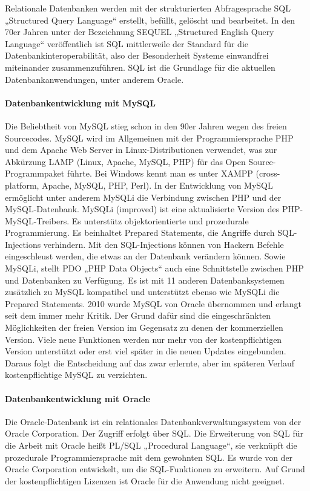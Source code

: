 Relationale Datenbanken werden mit der strukturierten Abfragesprache SQL „Structured Query Language“ erstellt, befüllt, gelöscht und bearbeitet. In den 70er Jahren unter der Bezeichnung SEQUEL „Structured English Query Language“ veröffentlich ist SQL mittlerweile der Standard für die Datenbankinteroperabilität, also der Besonderheit Systeme einwandfrei miteinander zusammenzuführen. SQL ist die Grundlage für die aktuellen Datenbankanwendungen, unter anderem Oracle.

\paragraph{Datenbankentwicklung mit MySQL\cite{MySQLigegenPDO}} 

Die Beliebtheit von MySQL stieg schon in den 90er Jahren wegen des freien Sourcecodes. MySQL wird im Allgemeinen mit der Programmiersprache PHP und dem Apache Web Server in Linux-Distributionen verwendet, was zur Abkürzung LAMP (Linux, Apache, MySQL, PHP) für das Open Source-Programmpaket führte. Bei Windows kennt man es unter XAMPP (cross-platform, Apache, MySQL, PHP, Perl).
In der Entwicklung von MySQL ermöglicht unter anderem MySQLi die Verbindung zwischen PHP und der MySQL-Datenbank. MySQLi (improved) ist eine aktualisierte Version des PHP-MySQL-Treibers. Es unterstütz objektorientierte und prozedurale Programmierung. Es beinhaltet Prepared Statements, die Angriffe durch SQL-Injections verhindern. Mit den SQL-Injections können von Hackern Befehle eingeschleust werden, die etwas an der Datenbank verändern können. \linebreak Sowie MySQLi, stellt PDO „PHP Data Objects“ auch eine Schnittstelle zwischen PHP und Datenbanken zu Verfügung. Es ist mit 11 anderen Datenbanksystemen zusätzlich zu MySQL kompatibel und unterstützt ebenso wie MySQLi die Prepared Statements. 
2010 wurde MySQL von Oracle übernommen und erlangt seit dem immer mehr Kritik. \cite{KritikanderMySQLDatenbank} Der Grund dafür sind die eingeschränkten Möglichkeiten der freien Version im Gegensatz zu denen der kommerziellen Version. Viele neue Funktionen werden nur mehr von der kostenpflichtigen Version unterstützt oder erst viel später in die neuen Updates eingebunden. Daraus folgt die Entscheidung auf das zwar erlernte, aber im späteren Verlauf kostenpflichtige MySQL zu verzichten.

\paragraph{Datenbankentwicklung mit Oracle}
Die Oracle-Datenbank ist ein relationales Datenbankverwaltungssystem von der Oracle Corporation. Der Zugriff erfolgt über SQL. Die Erweiterung von SQL für die Arbeit mit Oracle heißt PL/SQL „Procedural Language“, sie verknüpft die prozedurale Programmiersprache mit dem gewohnten SQL. Es wurde von der Oracle Corporation entwickelt, um die SQL-Funktionen zu erweitern. Auf Grund der kostenpflichtigen Lizenzen ist Oracle für die Anwendung nicht geeignet.

